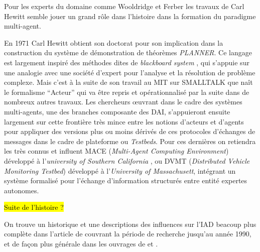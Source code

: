 Pour les experts du domaine comme Wooldridge  et Ferber  les travaux de Carl Hewitt semble jouer un grand rôle dans l'histoire dans la formation du paradigme multi-agent.

En 1971 Carl Hewitt obtient son doctorat pour son implication dans la construction du système de démonstration de théorèmes \textit{PLANNER}. Ce langage est largement inspiré des méthodes dites de \textit{blackboard system} , qui s'appuie sur une analogie avec une société d'expert pour l'analyse et la résolution de problème complexe. Mais c'est à la suite de son travail au MIT sur SMALLTALK  que naît le formalisme \enquote{Acteur}  qui va être repris et opérationnalisé par la suite dans de nombreux autres travaux. Les chercheurs œuvrant dans le cadre des systèmes multi-agents, une des branches composante des DAI, s’appuieront ensuite largement sur cette frontière très mince entre les notions d'acteurs et d'agents pour appliquer des versions plus ou moins dérivés de ces protocoles d'échanges de messages dans le cadre de plateforme ou \textit{Testbeds}. Pour ces dernières on retiendra les très connus et influent MACE (\textit{Multi-Agent Computing Environment}) développé à l'\textit{university of Southern California} , ou DVMT (\textit{Distributed Vehicle Monitoring Testbed}) développé à l'\textit{University of Massachusett}, intégrant un système formalisé pour l'échange d'information structurés entre entité expertes autonomes.

\hl{Suite de l'histoire ? }

On trouve un historique et une descriptions des influences sur l'IAD beacoup plus complète dans l'article de \textcite{Bond1988} couvrant la période de recherche jusqu'au année 1990, et de façon plus générale dans les ouvrages de \textcite{Wooldridge2009} et \textcite{Ferber1995}.



